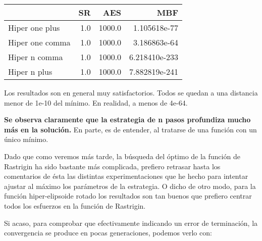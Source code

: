 \documentclass[11pt]{article}
\begin{document}
    \begin{tabular}{lrrr}
\toprule
{} &   SR &     AES &            MBF \\
\midrule
Hiper one plus  &  1.0 &  1000.0 &   1.105618e-77 \\
Hiper one comma &  1.0 &  1000.0 &   3.186863e-64 \\
Hiper n   comma &  1.0 &  1000.0 &  6.218410e-233 \\
Hiper n   plus  &  1.0 &  1000.0 &  7.882819e-241 \\
\bottomrule
\end{tabular}

    

    \[ \] Los resultados son en general muy satisfactorios. Todos se quedan
a una distancia menor de 1e-10 del mínimo. En realidad, a menos de
4e-64.

\textbf{Se observa claramente que la estrategia de n pasos profundiza
mucho más en la solución.} En parte, es de entender, al tratarse de una
función con un único mínimo.

Dado que como veremos más tarde, la búsqueda del óptimo de la función de
Rastrigin ha sido bastante más complicada, prefiero retrasar hasta los
comentarios de ésta las distintas experimentaciones que he hecho para
intentar ajustar al máximo los parámetros de la estrategia. O dicho de
otro modo, para la función hiper-elipsoide rotado los resultados son tan
buenos que prefiero centrar todos los esfuerzos en la función de
Rastrigin.

Si acaso, para comprobar que efectivamente indicando un error de
terminación, la convergencia se produce en pocas generaciones, podemos
verlo con:
\end{document}
